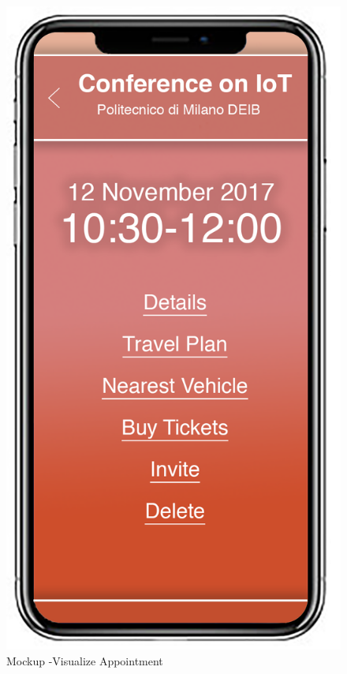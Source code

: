 \begin{figure}[H]	
	\centerline{\includegraphics[width=0.3\paperwidth]{Images/VisualizeAppointment}}
	\caption{Mockup -Visualize Appointment}
\end{figure}	
